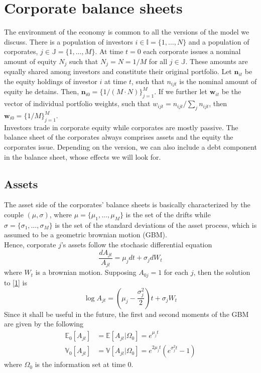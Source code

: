 \documentclass[11pt]{article}
\begin{document}
\section{Corporate balance sheets}\label{section1}
The environment of the economy is common to all the versions of the model we discuss. There is a population of investors $i \in \mathbb{I} = \{ 1,\dots,N\}$ and a population of corporates, $j\in\mathbb{J}=\{1,\dots,M\}$. At time $t=0$ each corporate issues a nominal amount of equity $N_j$ such that $N_j=N=1/M$ for all $j \in \mathbb{J}$. These amounts are equally shared among investors and constitute their original portfolio. Let $\mathbf{n}_{it}$ be the equity holdings of investor $i$ at time $t$, such that $n_{ijt}$ is the nominal amount of equity he detains. Then, $\mathbf{n}_{i0} = \{ 1/(M\cdot N)\}_{j=1}^M$. If we further let $\mathbf{w}_{it}$ be the vector of individual portfolio weights, such that $w_{ijt} = n_{ijt} / \sum_j n_{ijt}$, then $\mathbf{w}_{i0} = \{ 1/M\}_{j=1}^M$.\\
Investors trade in corporate equity  while corporates are mostly passive. The balance sheet of the corporates always comprises assets and the equity the corporates issue. Depending on the version, we can also include a debt component in the balance sheet, whose effects we will look for.
\subsection{Assets}
The asset side of the corporates' balance sheets is basically characterized by the couple $(\mu,\sigma)$, where $\mu = \{\mu_1,\dots,\mu_M\}$ is the set of the drifts while $\sigma = \{ \sigma_1,\dots,\sigma_M\}$ is the set of the standard deviations of the asset process, which is assumed to be a geometric brownian motion (GBM).\\
Hence, corporate $j$'s assets follow the stochasic differential equation
\begin{equation}\label{1}
	\frac{dA_{jt}}{A_{jt}} = \mu_j dt + \sigma_j dW_t
\end{equation}
where $W_t$ is a brownian motion. Supposing $A_{0j}=1$ for each $j$, then the solution to \eqref{1} is 
\begin{equation}\label{2}
	\log A_{jt} = \left ( \mu_j - \frac{\sigma^2_j}{2} \right )t + \sigma_j W_t
\end{equation}
Since it shall be useful in the future, the first and second moments of the GBM are given by the following
\begin{subequations}\label{3}
\begin{align}
	\mathbb{E}_0[A_{jt}] &= \mathbb{E}[A_{jt}|\Omega_0] = e^{\mu_j t}\label{3a}\\
	\mathbb{V}_0[A_{jt}] &= \mathbb{V}[A_{jt}|\Omega_0] = e^{2\mu_j t} ( e^{\sigma_j^2 t} -1)\label{3b}
\end{align}
\end{subequations}
where $\Omega_0$ is the information set at time $0$.
\end{document}
